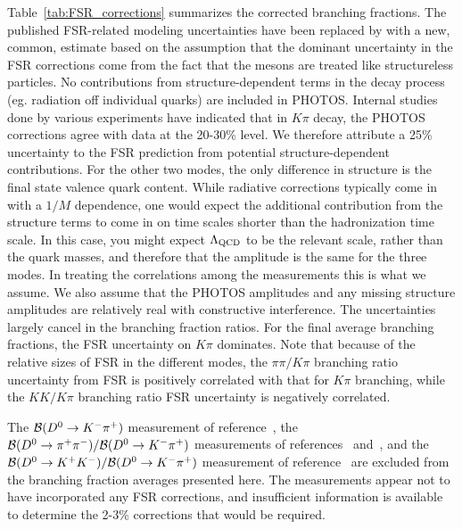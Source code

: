 Table~\ref{tab:FSR_corrections} summarizes the corrected branching fractions. 
The published FSR-related modeling uncertainties have been replaced by with a
new, common, estimate based on the assumption that the dominant uncertainty 
in the FSR corrections come from the fact that the mesons are treated like 
structureless particles. No contributions from structure-dependent terms in 
the decay process (eg. radiation off individual quarks) are included in PHOTOS. 
Internal studies done by various experiments have indicated that in $K\pi$ decay, 
the PHOTOS corrections agree with data at the 20-30\% level. 
We therefore attribute a 25\% uncertainty to the FSR prediction from potential 
structure-dependent contributions. For the other two modes, the only difference 
in structure is the final state valence quark content. While radiative corrections 
typically come in with a $1/M$ dependence, one would expect the additional 
contribution from the structure terms to come in on time scales shorter than 
the hadronization time scale. In this case, you might expect
$\rm \Lambda_{\rm QCD}$ to be the relevant scale, rather than the quark masses,
and therefore that the amplitude is the same for the three modes. In treating
the correlations among the measurements this is what we assume. We also assume
that the PHOTOS amplitudes and any missing structure amplitudes are relatively 
real with constructive interference.  The uncertainties largely cancel 
in the branching fraction ratios. For the final average branching 
fractions, the FSR uncertainty on $K\pi$ dominates. Note that because 
of the relative sizes of FSR in the different modes, the $\pi\pi/K\pi$ 
branching ratio uncertainty from FSR is positively correlated with that 
for $K\pi$ branching, while the $KK/K\pi$ branching ratio FSR uncertainty 
is negatively correlated.

The ${\cal B}(D^0\to K^-\pi^+)$ measurement of reference~\cite{Coan:1997ye}, the  
${\cal B}(D^0\to \pi^+\pi^-)/{\cal B}(D^0\to K^-\pi^+)$ measurements of 
references~\cite{Aitala:1997ff} 
and~\cite{Csorna:2001ww}, and the 
${\cal B}(D^0\to K^+ K^-)/{\cal B}(D^0\to K^-\pi^+)$ measurement
of reference~\cite{Csorna:2001ww} are excluded from the branching 
fraction averages presented here.
The measurements appear not to have incorporated any FSR corrections, 
and insufficient information
is available to determine the 2-3\% corrections that would be required.

